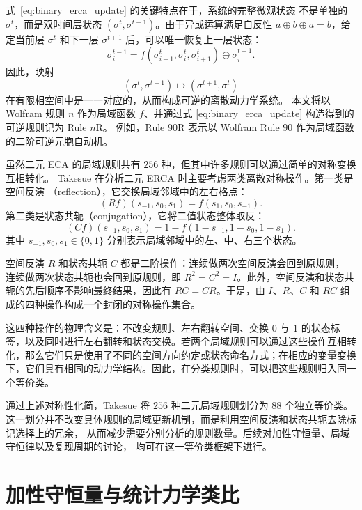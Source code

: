 \documentclass[reprint, amsmath, amssymb, aps, physrev,prb]{revtex4-2}
\begin{document}
式~\eqref{eq:binary_erca_update} 的关键特点在于，系统的完整微观状态
不是单独的 $\sigma^t$，而是双时间层状态
$(\sigma^t,\sigma^{t-1})$。由于异或运算满足自反性
$a\oplus b\oplus a=b$，给定当前层 $\sigma^t$ 和下一层
$\sigma^{t+1}$ 后，可以唯一恢复上一层状态：
\begin{equation}
    \sigma_i^{t-1}
    =
    f(\sigma_{i-1}^{t},\sigma_i^{t},\sigma_{i+1}^{t})
    \oplus
    \sigma_i^{t+1}.
\end{equation}
因此，映射
\[
    (\sigma^t,\sigma^{t-1})
    \longmapsto
    (\sigma^{t+1},\sigma^t)
\]
在有限相空间中是一一对应的，从而构成可逆的离散动力学系统。
本文将以 Wolfram 规则 $n$ 作为局域函数 $f$、并通过式
\eqref{eq:binary_erca_update} 构造得到的可逆规则记为 Rule $n$R\cite{wolfram}。
例如，Rule 90R 表示以 Wolfram Rule 90 作为局域函数的二阶可逆元胞自动机。

虽然二元 ECA 的局域规则共有 $256$ 种，但其中许多规则可以通过简单的对称变换互相转化。
Takesue 在分析二元 ERCA 时主要考虑两类离散对称操作。第一类是空间反演
（reflection），它交换局域邻域中的左右格点：
\begin{equation}
    (Rf)(s_{-1},s_0,s_1)
    =
    f(s_1,s_0,s_{-1}) .
\end{equation}
第二类是状态共轭（conjugation），它将二值状态整体取反：
\begin{equation}
    (Cf)(s_{-1},s_0,s_1)
    =
    1-f(1-s_{-1},1-s_0,1-s_1) .
\end{equation}
其中 $s_{-1},s_0,s_1\in\{0,1\}$ 分别表示局域邻域中的左、中、右三个状态。

空间反演 $R$ 和状态共轭 $C$ 都是二阶操作：连续做两次空间反演会回到原规则，
连续做两次状态共轭也会回到原规则，即 $R^2=C^2=I$。此外，空间反演和状态共轭的先后顺序不影响最终结果，因此有 $RC=CR$。于是，由
$I$、$R$、$C$ 和 $RC$ 组成的四种操作构成一个封闭的对称操作集合。

这四种操作的物理含义是：不改变规则、左右翻转空间、交换 $0$ 与 $1$ 的状态标签，以及同时进行左右翻转和状态交换。若两个局域规则可以通过这些操作互相转化，那么它们只是使用了不同的空间方向约定或状态命名方式；在相应的变量变换下，它们具有相同的动力学结构。因此，在分类规则时，可以把这些规则归入同一个等价类。

通过上述对称性化简，Takesue 将 $256$ 种二元局域规则划分为 $88$ 个独立等价类。
这一划分并不改变具体规则的局域更新机制，而是利用空间反演和状态共轭去除标记选择上的冗余，
从而减少需要分别分析的规则数量。后续对加性守恒量、局域守恒律以及复现周期的讨论，
均可在这一等价类框架下进行。



\section{加性守恒量与统计力学类比}
\end{document}
